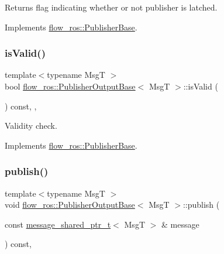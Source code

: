Returns flag indicating whether or not publisher is latched. 



Implements \hyperlink{classflow__ros_1_1_publisher_base_a51ef6d34734d3dc39053234491665d2c}{flow\+\_\+ros\+::\+Publisher\+Base}.

\mbox{\label{classflow__ros_1_1_publisher_output_base_a60ffa435ac1243b046d8029584c097a3}} 
\subsubsection{\texorpdfstring{is\+Valid()}{isValid()}}
{\footnotesize\ttfamily template$<$typename MsgT $>$ \\
bool \hyperlink{classflow__ros_1_1_publisher_output_base}{flow\+\_\+ros\+::\+Publisher\+Output\+Base}$<$ MsgT $>$\+::is\+Valid (\begin{DoxyParamCaption}{ }\end{DoxyParamCaption}) const\hspace{0.3cm}{\ttfamily [inline]}, {\ttfamily [final]}, {\ttfamily [virtual]}}



Validity check. 



Implements \hyperlink{classflow__ros_1_1_publisher_base_ac9bc27703de2394a0e1f3df7dac93548}{flow\+\_\+ros\+::\+Publisher\+Base}.

\mbox{\label{classflow__ros_1_1_publisher_output_base_a66abc7f5296a4b2c29c776539df70cd1}} 
\subsubsection{\texorpdfstring{publish()}{publish()}}
{\footnotesize\ttfamily template$<$typename MsgT $>$ \\
void \hyperlink{classflow__ros_1_1_publisher_output_base}{flow\+\_\+ros\+::\+Publisher\+Output\+Base}$<$ MsgT $>$\+::publish (\begin{DoxyParamCaption}\item[{const \hyperlink{namespaceflow__ros_a21a684f38ee2083b3858613317c46d82}{message\+\_\+shared\+\_\+ptr\+\_\+t}$<$ MsgT $>$ \&}]{message }\end{DoxyParamCaption}) const\hspace{0.3cm}{\ttfamily [inline]}, {\ttfamily [protected]}}



